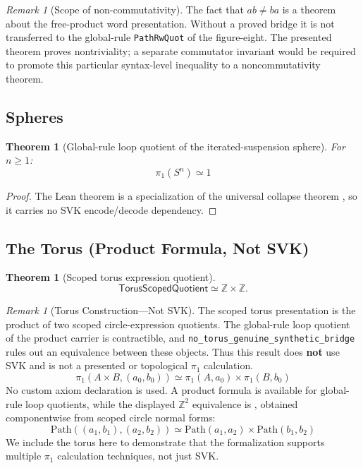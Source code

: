 \documentclass{lmcs}
\theoremstyle{definition}
\theoremstyle{plain}
\newtheorem{theorem}[definition]{Theorem}
\theoremstyle{remark}
\newtheorem{remark}[definition]{Remark}
\newcommand{\Path}{\mathrm{Path}}
\newcommand{\piOne}{\pi_1}
\newcommand{\ZZ}{\mathbb{Z}}
\begin{document}
\begin{remark}[Scope of non-commutativity]
The fact that $ab \neq ba$ is a theorem about the free-product word
presentation.  Without a proved bridge it is not transferred to the
global-rule \texttt{PathRwQuot} of the figure-eight.  The presented theorem
proves nontriviality; a separate commutator invariant would be required to
promote this particular syntax-level inequality to a noncommutativity theorem.
\end{remark}

\subsection{Spheres}

\begin{theorem}[Global-rule loop quotient of the iterated-suspension sphere]
For $n \geq 1$:
\[
\piOne(S^n) \simeq 1
\]
\end{theorem}

\begin{proof}
The Lean theorem  is a specialization of
the universal collapse theorem , so it carries
no SVK encode/decode dependency.
\end{proof}

\subsection{The Torus (Product Formula, Not SVK)}

\begin{theorem}[Scoped torus expression quotient]
\[
\mathsf{TorusScopedQuotient} \simeq \ZZ \times \ZZ.
\]
\end{theorem}

\begin{remark}[Torus Construction---Not SVK]
The scoped torus presentation is the product of two scoped circle-expression
quotients.  The global-rule loop quotient of the product carrier
is contractible, and \texttt{no\_torus\_genuine\_synthetic\_bridge} rules out
an equivalence between these objects.  Thus this result does \textbf{not} use
SVK and is not a presented or topological $\pi_1$ calculation.
\[
\piOne(A \times B, (a_0, b_0)) \simeq \piOne(A, a_0) \times \piOne(B, b_0)
\]
No custom axiom declaration is used.  A product formula is available for
global-rule loop quotients, while the displayed \(\ZZ^2\) equivalence is
, obtained componentwise from scoped circle
normal forms:
\[
\Path((a_1, b_1), (a_2, b_2)) \simeq \Path(a_1, a_2) \times \Path(b_1, b_2)
\]
We include the torus here to demonstrate that the formalization supports multiple $\piOne$ calculation techniques, not just SVK.
\end{remark}
\end{document}
